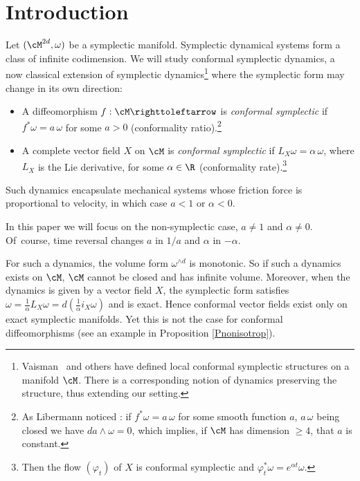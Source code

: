 \section{Introduction} \label{SecShortIntro}

Let $(\cM^{2d}, \omega)$ be a symplectic manifold. Symplectic dynamical systems form a class of infinite codimension. We will study conformal symplectic dynamics, a now classical extension of symplectic dynamics\footnote{Vaisman~\cite{Vaisman1985} and others have defined local conformal symplectic structures on a manifold $\cM$. There is a corresponding notion of dynamics preserving the structure, thus extending our setting.} where the symplectic form may change in its own direction:

\skpt
\begin{definition}
\begin{itemize}
\item A diffeomorphism $f: \cM \righttoleftarrow$ is \emph{conformal symplectic} if $f^*\omega=a\, \omega$ for some $a>0$ (conformality ratio).\footnote{As Libermann noticed \cite{Lib1959}: if $f^*\omega=a\, \omega$ for some smooth function $a$, $a\,\omega$ being closed we have $da \wedge \omega = 0$, which implies, if $\cM$ has dimension $\geq 4$, that $a$ is constant.}
\item A complete vector field $X$ on $\cM$ is \emph{conformal symplectic} if $L_X\omega=\alpha\, \omega$, where $L_X$ is the Lie derivative, for some $\alpha \in \R$ (conformality rate).\footnote{Then the flow $(\varphi_t)$ of $X$ is conformal symplectic and $\varphi_t^*\omega=e^{\alpha t}\omega$.}
\end{itemize}
\end{definition}

Such dynamics encapsulate mechanical systems whose friction force is proportional to velocity, in which case $a<1$ or $\alpha<0$.

In this paper we will focus on the non-symplectic case, \ie $a \neq 1$ and $\alpha \neq 0$. Of~course, time reversal changes $a$ in $1/a$ and $\alpha$ in $-\alpha$.

For such a dynamics, the volume form $\omega^{\wedge d}$ is monotonic. So if such a dynamics exists on $\cM$, $\cM$ cannot be closed and has infinite volume. Moreover, when the dynamics is given by a vector field $X$, the symplectic form satisfies $\omega=\frac{1}{\alpha} L_X\omega= d\left(\frac{1}{\alpha}i_X\omega\right)$ and is exact. Hence conformal vector fields exist only on exact symplectic manifolds. Yet this is not the case for conformal diffeomorphisms (see an example in Proposition \ref{Pnonisotrop}).

